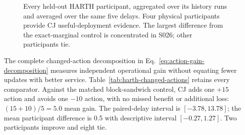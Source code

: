 \documentclass[10pt]{article}
\begin{document}
\begin{figure}[t]
\centering
{}
\caption{Every held-out HARTH participant, aggregated over its history
runs and averaged over the same five delays. Four physical participants
provide CJ useful-deployment evidence. The largest difference from the
exact-marginal control is concentrated in S026; other participants tie.}
\label{fig:harth-participants}
\end{figure}

The complete changed-action decomposition in
Eq.~\eqref{eq:action-gain-decomposition} measures independent operational
gain without equating fewer updates with better service.
Table~\ref{tab:harth-changed-actions} retains every comparator. Against
the matched block-sandwich control, CJ adds one $+15$ action and avoids
one $-10$ action, with no missed benefit or additional loss:
$(15+10)/5=5.0$ mean gain. The paired-delay interval is
$[-3.78,13.78]$; the mean participant difference is 0.5 with descriptive
interval $[-0.27,1.27]$. Two participants improve and eight tie.
\end{document}

